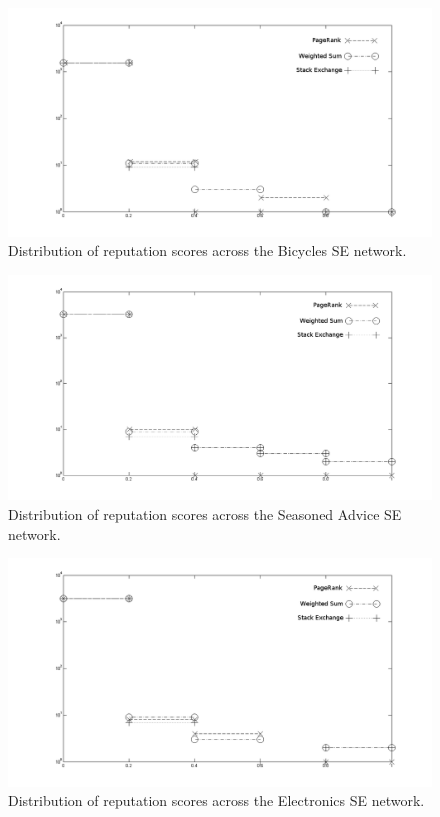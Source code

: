 \documentclass[]{final_report}
\begin{document}

\begin{figure}[ht!]
\centering
\includegraphics[width=120mm]{chap3/bicycles_hist.png}
\caption{Distribution of reputation scores across the Bicycles SE network.}\label{fig:histogram}
\end{figure}\label{gra:bicyclehist}

\begin{figure}[ht!]
\centering
\includegraphics[width=120mm]{chap3/cooking_hist.png}
\caption{Distribution of reputation scores across the Seasoned Advice SE network.}
\end{figure}\label{gra:cookinghist}

\begin{figure}[ht!]
\centering
\includegraphics[width=120mm]{chap3/electronics_hist.png}
\caption{Distribution of reputation scores across the Electronics SE network.}
\end{figure}\label{gra:electronicshist}
\end{document}
